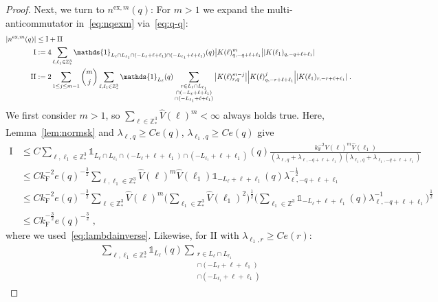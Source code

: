 \documentclass[12pt,a4paper]{article}
\numberwithin{equation}{section}
\newcommand{\1}{\mathbb{I}}
\newcommand{\ex}{\mathrm{ex}}
\newcommand{\F}{\mathrm{F}}
\newcommand{\I}{\mathrm{I}}
\newcommand{\II}{\mathrm{II}}
\newcommand{\Z}{\mathbb{Z}}
\newcommand{\half}{\frac{1}{2}}
\theoremstyle{plain}
\theoremstyle{definition}
\theoremstyle{remark}
\theoremstyle{plain}
\theoremstyle{definition}
\theoremstyle{remark}
\begin{document}
\begin{proof}
Next, we turn to $ n^{\ex,m}(q) $: For $ m > 1 $ we expand the multi-anticommutator in~\eqref{eq:nqexm} via~\eqref{eq:q-q}:
\begin{equation}
\begin{aligned}
	|n^{\ex,m}(q)|
	&\leq \I + \II \\
	\I
	&:= 4 \sum_{\ell,\ell_1 \in \Z^3_*}
		\mathds{1}_{L_\ell \cap L_{\ell_1} \cap (-L_\ell + \ell + \ell_1) \cap (-L_{\ell_1} + \ell + \ell_1)}(q)
		\abs{K(\ell)^m_{q,-q+\ell+\ell_1}}
		\abs{K(\ell_1)_{q,-q+\ell+\ell_1}} \\
	\II
	&:= 2 \sum_{1 \le j \le m-1} {{m}\choose j} \sum_{\ell,\ell_1 \in \Z^3_*}
		\mathds{1}_{L_\ell}(q)
		\sum_{\substack{r\in L_{\ell} \cap L_{\ell_1}\\ \cap (-L_{\ell}+\ell+\ell_1) \\ \cap (-L_{\ell_1}+\ell+\ell_1 )}}
		\abs{K(\ell)^{m-j}_{r,q}}
		\abs{K(\ell)^j_{q,-r+\ell+\ell_1}}
		\abs{K(\ell_1)_{r,-r+\ell+\ell_1}} \;.
\end{aligned}
\end{equation}
We first consider $ m > 1 $, so $ \sum_{\ell \in \Z^3_*} \hat{V}(\ell)^m < \infty $ always holds true. Here, Lemma~\ref{lem:normsk} and $  \lambda_{\ell,q} \geq C e(q) $, $ \lambda_{\ell_1,q} \geq C e(q) $ give
\begin{align}
	\I
	&\leq C \sum_{\ell,\ell_1 \in \Z^3_*}
		\mathds{1}_{L_\ell \cap L_{\ell_1} \cap (-L_\ell + \ell + \ell_1) \cap (-L_{\ell_1} + \ell + \ell_1)}(q)
		\frac{k_{\F}^{-2} \hat{V}(\ell)^m \hat{V}(\ell_1)}{(\lambda_{\ell,q} + \lambda_{\ell,-q+\ell+\ell_1}) (\lambda_{\ell_1,q} + \lambda_{\ell_1,-q+\ell+\ell_1})} \nonumber\\
	&\leq C k_{\F}^{-2} e(q)^{-\frac 32} \sum_{\ell,\ell_1 \in \Z^3_*} \hat{V}(\ell)^m \hat{V}(\ell_1)
		\mathds{1}_{-L_\ell + \ell + \ell_1}(q)
		\lambda_{\ell,-q+\ell+\ell_1}^{-\frac 12} \nonumber\\ 
	&\leq C k_{\F}^{-2} e(q)^{-\frac 32} \sum_{\ell \in \Z^3_*} \hat{V}(\ell)^m
		\Bigg( \sum_{\ell_1 \in \Z^3_*} \hat{V}(\ell_1)^2 \Bigg)^{\half}
		\Bigg( \sum_{\ell_1 \in \Z^3} \mathds{1}_{-L_\ell + \ell + \ell_1}(q)
		\lambda_{\ell,-q+\ell+\ell_1}^{-1} \Bigg)^{\half} \nonumber\\
	&\leq C k_{\F}^{-\frac 32} e(q)^{-\frac 32} \;,
\end{align}
where we used~\eqref{eq:lambdainverse}. Likewise, for $ \II $ with $ \lambda_{\ell_1,r} \ge C e(r) $:
\begin{align}
	&\sum_{\ell,\ell_1 \in \Z^3_*}
		\mathds{1}_{L_\ell}(q)
		\sum_{\substack{r\in L_{\ell} \cap L_{\ell_1}\\ \cap (-L_{\ell}+\ell+\ell_1) \\ \cap (-L_{\ell_1}+\ell+\ell_1 )}}

\end{align}
\end{proof}
\end{document}

